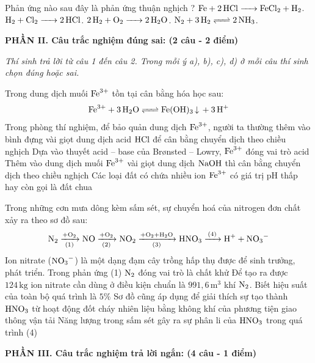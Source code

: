 \documentclass[11pt,a4paper]{article}
\begin{document}
\begin{ex}%
Phản ứng nào sau đây là phản ứng thuận nghịch ?
\choice
{$\ce{Fe + 2HCl -> FeCl2 + H2}$.}
{$\ce{H2 + Cl2 -> 2HCl}$.}
{$\ce{2H2 + O2 -> 2H2O}$.}
{\True $\ce{N2 + 3H2 <=> 2NH3}$.}

\end{ex}

\vspace{6pt}
\noindent
\textbf{\large\color{mainGreen}PHẦN II. Câu trắc nghiệm đúng sai: (2 câu - 2 điểm)}

\textit{Thí sinh trả lời từ câu 1 đến câu 2. Trong mỗi ý a), b), c), d) ở mỗi câu thí sinh chọn đúng hoặc sai.}
\vspace{4pt}

\begin{ex}%
Trong dung dịch muối $\ce{Fe^{3+}}$ tồn tại cân bằng hóa học sau:
$$\ce{Fe^{3+} + 3H2O <=> Fe(OH)3 v + 3H+}$$
\choiceTF
{\True Trong phòng thí nghiệm, để bảo quản dung dịch $\ce{Fe^{3+}}$, người ta thường thêm vào bình đựng vài giọt dung dịch acid $\ce{HCl}$ để cân bằng chuyển dịch theo chiều nghịch}
{\True Dựa vào thuyết acid – base của Brønsted – Lowry, $\ce{Fe^{3+}}$ đóng vai trò acid}
{Thêm vào dung dịch muối $\ce{Fe^{3+}}$ vài giọt dung dịch $\ce{NaOH}$ thì cân bằng chuyển dịch theo chiều nghịch}
{\True Các loại đất có chứa nhiều ion $\ce{Fe^{3+}}$ có giá trị pH thấp hay còn gọi là đất chua}

\end{ex}

\begin{ex}%
Trong những cơn mưa dông kèm sấm sét, sự chuyển hoá của nitrogen đơn chất xảy ra theo sơ đồ sau:
$$\ce{N2 ->[+O_2][(1)] NO ->[+O_2][(2)] NO2 ->[+O_2 + H_2O][(3)] HNO3 ->[(4)] H+ + NO3^-}$$
Ion nitrate ($\ce{NO3-}$) là một dạng đạm cây trồng hấp thụ được để sinh trưởng, phát triển.
\choiceTF
{\True Trong phản ứng (1) $\ce{N2}$ đóng vai trò là chất khử}
{Để tạo ra được $124\,\text{kg}$ ion nitrate cần dùng ở điều kiện chuẩn là $991{,}6\,\text{m}^3$ khí $\ce{N2}$. Biết hiệu suất của toàn bộ quá trình là $5\%$}
{\True Sơ đồ cũng áp dụng để giải thích sự tạo thành $\ce{HNO3}$ từ hoạt động đốt cháy nhiên liệu bằng không khí của phương tiện giao thông vận tải}
{Năng lượng trong sấm sét gây ra sự phân li của $\ce{HNO3}$ trong quá trình (4)}

\end{ex}

\vspace{6pt}
\noindent
\textbf{\large\color{mainGreen}PHẦN III. Câu trắc nghiệm trả lời ngắn: (4 câu - 1 điểm)}
\end{document}
